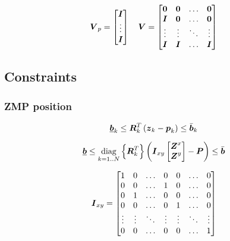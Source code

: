 \begin{equation*}
    \mbox{\boldmath $V$}_p = 
    \begin{bmatrix}
        \mbox{\boldmath $I$}\\
        \vdots\\
        \mbox{\boldmath $I$}\\
    \end{bmatrix}
    \quad
    \mbox{\boldmath $V$} = 
    \begin{bmatrix}
        \mbox{\boldmath $0$}   &   \mbox{\boldmath $0$}   & \dots     & \mbox{\boldmath $0$} \\
        \mbox{\boldmath $I$}   &   \mbox{\boldmath $0$}   & \dots     & \mbox{\boldmath $0$} \\
        \vdots  &   \vdots  & \ddots    & \vdots \\
        \mbox{\boldmath $I$}   &   \mbox{\boldmath $I$}   & \dots     & \mbox{\boldmath $I$} \\
    \end{bmatrix}
\end{equation*}



\subsection{Constraints}

\subsubsection{ZMP position}
\begin{equation*}
    \underline{\mbox{\boldmath $b$}}_k \le \mbox{\boldmath $R$}_k^T \left( \mbox{\boldmath $z$}_k - \mbox{\boldmath $p$}_k \right) \le \bar{\mbox{\boldmath $b$}}_k\\
\end{equation*}

\begin{equation*}
    \underline{\mbox{\boldmath $b$}} 
    \le 
    \underset{k = 1..N}{\operatorname{diag}}\left\{\mbox{\boldmath $R$}_k^T\right\}
    \left(
        \mbox{\boldmath $I$}_{xy} 
        \begin{bmatrix} \mbox{\boldmath $Z$}^x \\ \mbox{\boldmath $Z$}^y \end{bmatrix} 
        -
        \mbox{\boldmath $P$}
    \right) 
    \le
    \bar{\mbox{\boldmath $b$}}
\end{equation*}

\begin{equation*}
    \mbox{\boldmath $I$}_{xy} =
    \begin{bmatrix}
        1       &   0   & \dots &   0   &   0   & \dots &   0  \\
        0       &   0   & \dots &   1   &   0   & \dots &   0  \\
        0       &   1   & \dots &   0   &   0   & \dots &   0  \\
        0       &   0   & \dots &   0   &   1   & \dots &   0  \\
        \vdots  &\vdots &\ddots &\vdots &\vdots &\ddots &\vdots\\
        0       &   0   & \dots &   0   &   0   & \dots &   1  \\
    \end{bmatrix}
\end{equation*}

